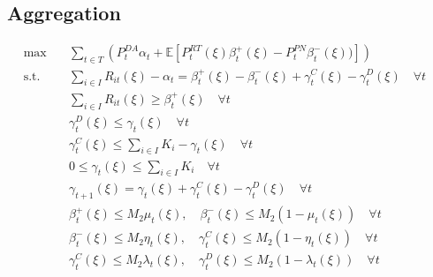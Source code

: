 \documentclass[10pt]{article}
\begin{document}
\subsection{Aggregation}
\begin{subequations}
    \begin{align}
    \text{max} \quad &\sum_{t\in T}\left(P_t^{DA}\alpha_t + \mathbb{E}\left[P_t^{RT}(\xi)\beta_{t}^{+}(\xi) - P_t^{PN}\beta_{t}^{-}(\xi))\right]\right)&\\   
    \text{s.t.} \quad & \sum_{i \in I} R_{it}(\xi) - \alpha_t = \beta^+_t(\xi) - \beta^-_t(\xi) + \gamma^C_t(\xi) - \gamma^D_t(\xi) \quad \forall t &\\
    &\sum_{i\in I}R_{it}(\xi) \geq \beta_{t}^{+}(\xi) \quad \forall t &\\ 
    &\gamma^D_t(\xi) \le \gamma_{t}(\xi) \quad \forall t &\\
    &\gamma^C_t(\xi) \le \sum_{i \in I}K_i - \gamma_{t}(\xi) \quad \forall t &\\
    &0 \leq \gamma_t(\xi) \leq \sum_{i \in I} K_i \quad \forall t &\\
    &\gamma_{t+1}(\xi) = \gamma_{t}(\xi) + \gamma^C_t(\xi) - \gamma^D_t(\xi) \quad \forall t &\\
    &\beta^+_t(\xi) \le M_2 \mu_t(\xi), \quad \beta^-_t(\xi) \le M_2 (1 - \mu_t(\xi)) \quad \forall t &\\ 
    &\beta^-_t(\xi) \le M_2 \eta_t(\xi), \quad \gamma^C_t(\xi) \le M_2 (1 - \eta_t(\xi)) \quad \forall t &\\
    &\gamma^C_t(\xi) \le M_2\lambda_t(\xi), \quad \gamma^D_t(\xi) \le M_2(1 - \lambda_t(\xi)) \quad \forall t &
    \end{align}
\end{subequations}
\end{document}
